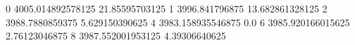 0 4005.014892578125 21.85595703125
1 3996.841796875 13.682861328125
2 3988.7880859375 5.629150390625
4 3983.158935546875 0.0
6 3985.920166015625 2.76123046875
8 3987.552001953125 4.39306640625
